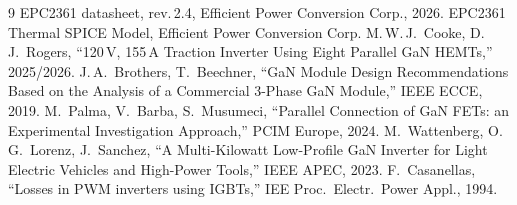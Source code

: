 \documentclass[10pt,twocolumn]{article}
\begin{document}
\begin{thebibliography}{9}\footnotesize
{} EPC2361 datasheet, rev.\,2.4, Efficient Power Conversion Corp., 2026.
 EPC2361 Thermal SPICE Model, Efficient Power Conversion Corp.
 M.\,W.\,J.\ Cooke, D.\,J.\ Rogers, ``120\,V, 155\,A Traction Inverter
  Using Eight Parallel GaN HEMTs,'' 2025/2026.
 J.\,A.\ Brothers, T.\ Beechner, ``GaN Module Design
  Recommendations Based on the Analysis of a Commercial 3-Phase GaN Module,'' IEEE ECCE,
  2019.
 M.\ Palma, V.\ Barba, S.\ Musumeci, ``Parallel Connection of GaN
  FETs: an Experimental Investigation Approach,'' PCIM Europe, 2024.
 M.\ Wattenberg, O.\,G.\ Lorenz, J.\ Sanchez, ``A Multi-Kilowatt
  Low-Profile GaN Inverter for Light Electric Vehicles and High-Power Tools,'' IEEE APEC,
  2023.
 F.\ Casanellas, ``Losses in PWM inverters using IGBTs,'' IEE
  Proc.\ Electr.\ Power Appl., 1994.
\end{thebibliography}
\end{document}

